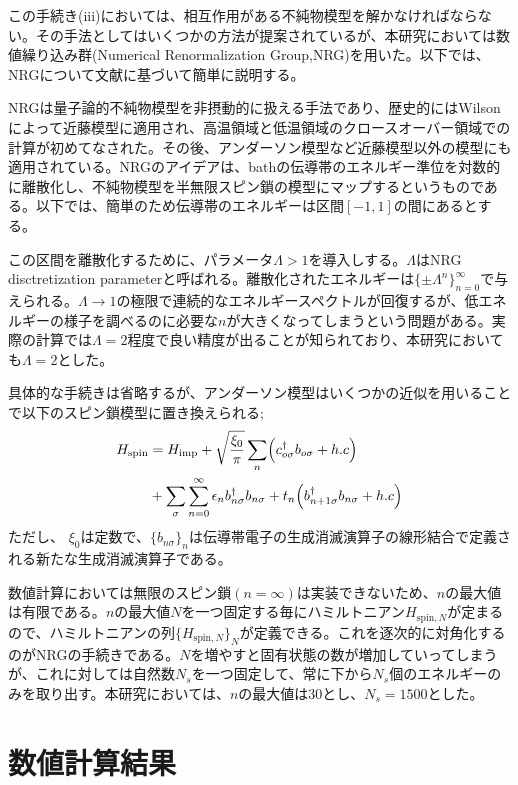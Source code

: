 \documentclass[12pt]{jsbook}
\begin{document}
この手続き(iii)においては、相互作用がある不純物模型を解かなければならない。その手法としてはいくつかの方法が提案されているが、本研究においては数値繰り込み群(Numerical Renormalization Group,NRG)を用いた。以下では、NRGについて文献\cite{RevModPhys.80.395}に基づいて簡単に説明する。

NRGは量子論的不純物模型を非摂動的に扱える手法であり、歴史的にはWilsonによって近藤模型に適用され、高温領域と低温領域のクロースオーバー領域での計算が初めてなされた。その後、アンダーソン模型など近藤模型以外の模型にも適用されている。NRGのアイデアは、bathの伝導帯のエネルギー準位を対数的に離散化し、不純物模型を半無限スピン鎖の模型にマップするというものである。以下では、簡単のため伝導帯のエネルギーは区間$[-1,1]$の間にあるとする。

この区間を離散化するために、パラメータ$\Lambda > 1$を導入しする。$\Lambda$はNRG disctretization parameterと呼ばれる。離散化されたエネルギーは$\{\pm\Lambda^n\}_{n=0}^{\infty}$で与えられる。$\Lambda\to 1$の極限で連続的なエネルギースペクトルが回復するが、低エネルギーの様子を調べるのに必要な$n$が大きくなってしまうという問題がある。実際の計算では$\Lambda=2$程度で良い精度が出ることが知られており、本研究においても$\Lambda=2$とした。

具体的な手続きは省略するが、アンダーソン模型はいくつかの近似を用いることで以下のスピン鎖模型に置き換えられる;
\begin{eqnarray}
    H_{\mathrm{spin}}&=H_{\mathrm{imp}} + \sqrt{\frac{\xi_0}{\pi}}\sum_n \Bigl(c^{\dagger}_{o\sigma}b_{o\sigma}+h.c\Bigr) \\
    &+ \sum_{\sigma}\sum_{n=0}^{\infty}\epsilon_n b_{n\sigma}^{\dagger}b_{n\sigma} + t_n\Bigl(b_{n+1\sigma}^{\dagger}b_{n\sigma}+h.c\Bigr)
\end{eqnarray}
ただし、
$\xi_0$は定数で、$\{b_{n\sigma}\}_{n}$は伝導帯電子の生成消滅演算子の線形結合で定義される新たな生成消滅演算子である。

数値計算においては無限のスピン鎖$(n=\infty)$は実装できないため、$n$の最大値は有限である。$n$の最大値$N$を一つ固定する毎にハミルトニアン$H_{\mathrm{spin},N}$が定まるので、ハミルトニアンの列$\{H_{\mathrm{spin},N}\}_N$が定義できる。これを逐次的に対角化するのがNRGの手続きである。$N$を増やすと固有状態の数が増加していってしまうが、これに対しては自然数$N_s$を一つ固定して、常に下から$N_s$個のエネルギーのみを取り出す。本研究においては、$n$の最大値は30とし、$N_s=1500$とした。

\chapter{数値計算結果}
\end{document}
